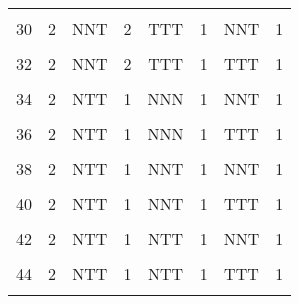 \begin{table}[H]
{\begin{tabular}[t]{cccccccc}
			\cellcolor{gray!6}{29} & \cellcolor{gray!6}{2} & \cellcolor{gray!6}{NNT} & \cellcolor{gray!6}{2} & \cellcolor{gray!6}{TTT} & \cellcolor{gray!6}{1} & \cellcolor{gray!6}{NNN} & \cellcolor{gray!6}{1}\\
			30 & 2 & NNT & 2 & TTT & 1 & NNT & 1\\
			\cellcolor{gray!6}{31} & \cellcolor{gray!6}{2} & \cellcolor{gray!6}{NNT} & \cellcolor{gray!6}{2} & \cellcolor{gray!6}{TTT} & \cellcolor{gray!6}{1} & \cellcolor{gray!6}{NTT} & \cellcolor{gray!6}{1}\\
			32 & 2 & NNT & 2 & TTT & 1 & TTT & 1\\
			\cellcolor{gray!6}{33} & \cellcolor{gray!6}{2} & \cellcolor{gray!6}{NTT} & \cellcolor{gray!6}{1} & \cellcolor{gray!6}{NNN} & \cellcolor{gray!6}{1} & \cellcolor{gray!6}{NNN} & \cellcolor{gray!6}{2}\\
			34 & 2 & NTT & 1 & NNN & 1 & NNT & 1\\
			\cellcolor{gray!6}{35} & \cellcolor{gray!6}{2} & \cellcolor{gray!6}{NTT} & \cellcolor{gray!6}{1} & \cellcolor{gray!6}{NNN} & \cellcolor{gray!6}{1} & \cellcolor{gray!6}{NTT} & \cellcolor{gray!6}{1}\\
			36 & 2 & NTT & 1 & NNN & 1 & TTT & 1\\
			\cellcolor{gray!6}{37} & \cellcolor{gray!6}{2} & \cellcolor{gray!6}{NTT} & \cellcolor{gray!6}{1} & \cellcolor{gray!6}{NNT} & \cellcolor{gray!6}{1} & \cellcolor{gray!6}{NNN} & \cellcolor{gray!6}{1}\\
			38 & 2 & NTT & 1 & NNT & 1 & NNT & 1\\
			\cellcolor{gray!6}{39} & \cellcolor{gray!6}{2} & \cellcolor{gray!6}{NTT} & \cellcolor{gray!6}{1} & \cellcolor{gray!6}{NNT} & \cellcolor{gray!6}{1} & \cellcolor{gray!6}{NTT} & \cellcolor{gray!6}{1}\\
			40 & 2 & NTT & 1 & NNT & 1 & TTT & 1\\
			\cellcolor{gray!6}{41} & \cellcolor{gray!6}{2} & \cellcolor{gray!6}{NTT} & \cellcolor{gray!6}{1} & \cellcolor{gray!6}{NTT} & \cellcolor{gray!6}{1} & \cellcolor{gray!6}{NNN} & \cellcolor{gray!6}{1}\\
			42 & 2 & NTT & 1 & NTT & 1 & NNT & 1\\
			\cellcolor{gray!6}{43} & \cellcolor{gray!6}{2} & \cellcolor{gray!6}{NTT} & \cellcolor{gray!6}{1} & \cellcolor{gray!6}{NTT} & \cellcolor{gray!6}{1} & \cellcolor{gray!6}{NTT} & \cellcolor{gray!6}{1}\\
			44 & 2 & NTT & 1 & NTT & 1 & TTT & 1\\
			\cellcolor{gray!6}{45} & \cellcolor{gray!6}{2} & \cellcolor{gray!6}{NTT} & \cellcolor{gray!6}{1} & \cellcolor{gray!6}{TTT} & \cellcolor{gray!6}{1} & \cellcolor{gray!6}{NNN} & \cellcolor{gray!6}{1}\\

\end{tabular}}
\end{table}
